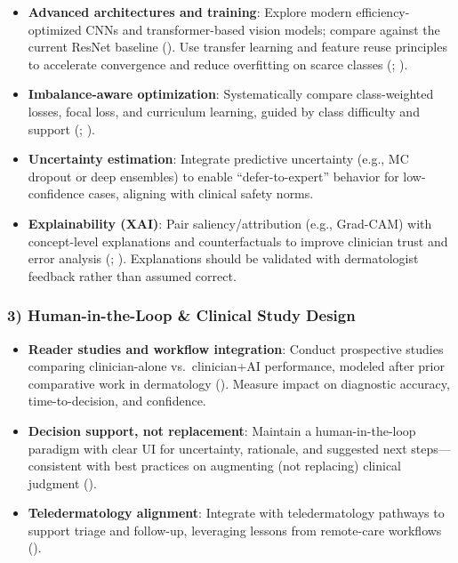 \documentclass[
  12pt,
  oneside]{article}
\providecommand{\tightlist}{%
  \setlength{\itemsep}{0pt}\setlength{\parskip}{0pt}}
\begin{document}
\begin{itemize}
\tightlist
\item
  \textbf{Advanced architectures and training}: Explore modern
  efficiency-optimized CNNs and transformer-based vision models; compare
  against the current ResNet baseline (). Use transfer learning and feature reuse principles to
  accelerate convergence and reduce overfitting on scarce classes
  (;
  ).
\item
  \textbf{Imbalance-aware optimization}: Systematically compare
  class-weighted losses, focal loss, and curriculum learning, guided by
  class difficulty and support (; ).
\item
  \textbf{Uncertainty estimation}: Integrate predictive uncertainty
  (e.g., MC dropout or deep ensembles) to enable ``defer-to-expert''
  behavior for low-confidence cases, aligning with clinical safety
  norms.
\item
  \textbf{Explainability (XAI)}: Pair saliency/attribution (e.g.,
  Grad-CAM) with concept-level explanations and counterfactuals to
  improve clinician trust and error analysis
  (;
  ). Explanations
  should be validated with dermatologist feedback rather than assumed
  correct.
\end{itemize}

\subsubsection{3) Human-in-the-Loop \& Clinical Study
Design}\label{human-in-the-loop-clinical-study-design}

\begin{itemize}
\tightlist
\item
  \textbf{Reader studies and workflow integration}: Conduct prospective
  studies comparing clinician-alone vs.~clinician+AI performance,
  modeled after prior comparative work in dermatology
  (). Measure
  impact on diagnostic accuracy, time-to-decision, and confidence.
\item
  \textbf{Decision support, not replacement}: Maintain a
  human-in-the-loop paradigm with clear UI for uncertainty, rationale,
  and suggested next steps---consistent with best practices on
  augmenting (not replacing) clinical judgment
  ().
\item
  \textbf{Teledermatology alignment}: Integrate with teledermatology
  pathways to support triage and follow-up, leveraging lessons from
  remote-care workflows ().
\end{itemize}
\end{document}
